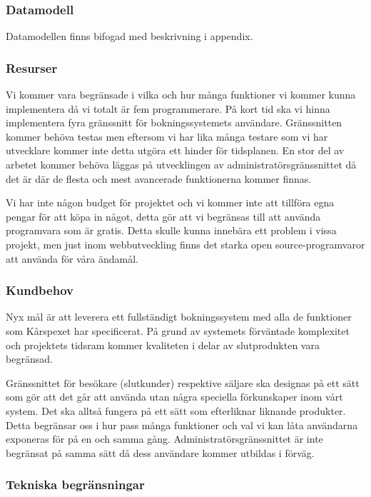 \documentclass[a4paper, twoside, 11pt, titlepage]{article}
\begin{document}
		\subsubsection{Datamodell}


		Datamodellen finns bifogad med beskrivning i appendix.

		\subsubsection{Resurser}


		Vi kommer vara begränsade i vilka och hur många funktioner vi kommer kunna implementera då vi totalt är fem programmerare. På kort tid ska vi hinna implementera fyra gränssnitt för bokningssystemets användare. Gränssnitten kommer behöva testas men eftersom vi har lika många testare som vi har utvecklare kommer inte detta utgöra ett hinder för tidsplanen. En stor del av arbetet kommer behöva läggas på utvecklingen av administratörsgränssnittet då det är där de flesta och mest avancerade funktionerna kommer finnas.

		Vi har inte någon budget för projektet och vi kommer inte att tillföra egna pengar för att köpa in något, detta gör att vi begränsas till att använda programvara som är gratis. Detta skulle kunna innebära ett problem i vissa projekt, men just inom webbutveckling finns det starka open source-programvaror att använda för våra ändamål.

		\subsubsection{Kundbehov}


		Nyx mål är att leverera ett fullständigt bokningssystem med alla de funktioner som Kårspexet har specificerat. På grund av systemets förväntade komplexitet och projektets tidsram kommer kvaliteten i delar av slutprodukten vara begränsad.

		Gränssnittet för besökare (slutkunder) respektive säljare ska designas på ett sätt som gör att det går att använda utan några speciella förkunskaper inom vårt system. Det ska alltså fungera på ett sätt som efterliknar liknande produkter. Detta begränsar oss i hur pass många funktioner och val vi kan låta användarna exponeras för på en och samma gång. Administratörsgränssnittet är inte begränsat på samma sätt då dess användare kommer utbildas i förväg.

		\subsubsection{Tekniska begränsningar}
\end{document}
